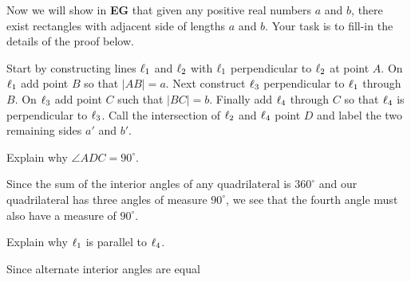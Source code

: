 \documentclass{ximera}
\begin{document}
\begin{question}\label{112} 
Now we will show in \textbf{EG} that given any positive real numbers
$a$ and $b$, there exist rectangles with adjacent side of lengths $a$
and $b$. Your task is to fill-in the details of the proof below.

Start by constructing lines $\ell_1$ and $\ell_2$ with $\ell_1$
perpendicular to $\ell_2$ at point $A$. On $\ell_1$ add point $B$ so that
$|AB|=a$. Next construct $\ell_3$ perpendicular to $\ell_1$ through
$B$. On $\ell_3$ add point $C$ such that $|BC|=b$. Finally add $\ell_4$
through $C$ so that $\ell_4$ is perpendicular to $\ell_3$. Call the
intersection of $\ell_2$ and $\ell_4$ point $D$ and label the two
remaining sides $a'$ and $b'$.
\begin{image}
\end{image}
Explain why $\angle ADC = 90^\circ$.
\begin{solution}
\begin{freeResponse}
Since the sum of the interior angles of any quadrilateral is
$360^\circ$ and our quadrilateral has three angles of measure
$90^\circ$, we see that the fourth angle must also have a measure of
$90^\circ$.
\end{freeResponse}
\end{solution}
Explain why $\ell_1$ is parallel to $\ell_4$.
\begin{solution}
\begin{freeResponse}
Since alternate interior angles are equal
\begin{image}
\end{image}
\end{freeResponse}
\end{solution}
\end{question}
\end{document}
